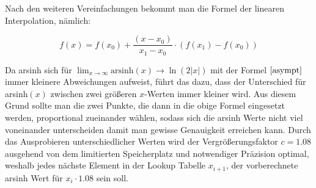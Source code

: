 \documentclass[course=erap]{aspdoc}
\begin{document}
    Nach den weiteren Vereinfachungen bekommt man die Formel der linearen Interpolation, nämlich:
    
    \begin{equation}
        f(x) = f(x_0) + \frac{(x - x_0)}{x_1 - x_0} \cdot (f(x_1) - f(x_0))
    \end{equation}
    
    Da arsinh sich für $\lim_{x \to \infty} \text{arsinh}(x) \rightarrow \ln(2|x|)$ mit der Formel $\eqref{asympt}$ immer kleinere Abweichungen aufweist, führt das dazu, dass der Unterschied für arsinh$(x)$ zwischen zwei größeren $x$-Werten immer kleiner wird. Aus diesem Grund sollte man die zwei Punkte, die dann in die obige Formel eingesetzt werden, proportional zueinander wählen, sodass sich die arsinh Werte nicht viel voneinander unterscheiden damit man gewisse Genauigkeit erreichen kann. Durch das Ausprobieren unterschiedlicher Werten wird der Vergrößerungsfaktor $c = 1.08$ ausgehend von dem limitierten Speicherplatz und notwendiger Präzision optimal, weshalb jedes nächste Element in der Lookup Tabelle $x_{i+1}$, der vorberechnete arsinh Wert für $x_{i} \cdot 1.08$ sein soll. 
    
    \vspace{0.25in}
    
    
\end{document}
